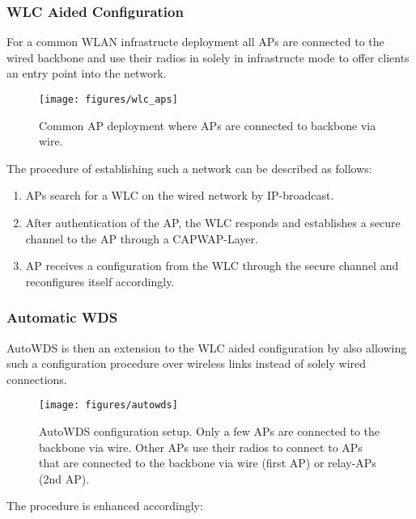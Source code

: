 	\newpage
      
      \subsubsection{WLC Aided Configuration}
	For a common WLAN infrastructe deployment all APs are connected to the wired backbone and use their radios in solely in infrastructe mode to 
	offer clients an entry point into the network.
	\begin{figure}[h!]
	  \centering
	  \texttt{[image: figures/wlc\_aps]}
	  \caption{Common AP deployment where APs are connected to backbone via wire.}
	  \label{fig:wlc_aps}
	\end{figure}
	The procedure of establishing such a network can be described as follows:
	\begin{enumerate}
	 \item APs search for a \ac{WLC} on the wired network by \ac{IP}-broadcast.
	 \item After authentication of the \ac{AP}, the \ac{WLC} responds and establishes a secure channel to the \ac{AP} through a \ac{CAPWAP}-Layer.
	 \item \ac{AP} receives a configuration from the \ac{WLC} through the secure channel and reconfigures itself accordingly.
	\end{enumerate}
	
      \subsubsection{Automatic \ac{WDS}}
	\label{autowdsbasic}
	AutoWDS is then an extension to the WLC aided configuration by also allowing such a configuration procedure over wireless links instead of solely wired connections.
            
	\begin{figure}[h!]
	  \centering
	  \texttt{[image: figures/autowds]}
	  \caption{AutoWDS configuration setup. Only a few APs are connected to the backbone via wire. 
	    Other APs use their radios to connect to APs that are connected to the backbone via wire (first \ac{AP}) or relay-APs (2nd \ac{AP}).}
	  \label{fig:autowds}
	\end{figure}
	
	The procedure is enhanced accordingly:
	
